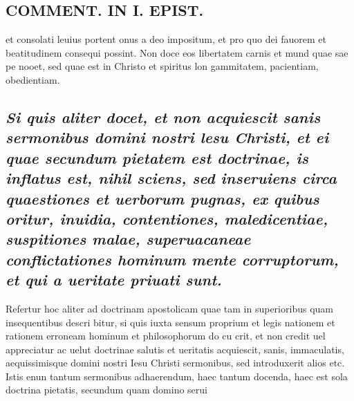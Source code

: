 \documentclass{article}
\begin{document}
\begin{pages}
\section*{COMMENT. IN I. EPIST. }
\marginpar{[ p.156 ]}\pstart et consolati leuius portent onus a deo impositum, et pro quo dei fauorem et beatitudinem consequi possint. Non doce eos libertatem carnis et mund quae sae pe nooet, sed quae est in Christo et spiritus lon gammitatem, pacientiam, obedientiam.  \pend
{}
{}
\subsection*{\textit{Si quis aliter docet, et non acquiescit sanis sermonibus domini nostri lesu Christi, et ei quae secundum pietatem est doctrinae, is inflatus est, nihil sciens, sed inseruiens circa quaestiones et uerborum pugnas, ex quibus oritur, inuidia, contentiones, maledicentiae, suspitiones malae, superuacaneae conflictationes hominum mente corruptorum, et qui a ueritate priuati sunt. }}\pstart Refertur hoc aliter ad doctrinam apostolicam quae tam in superioribus quam insequentibus descri bitur, si quis iuxta sensum proprium et legis nationem et rationem erroneam hominum et philosophorum do cu crit, et non credit uel appreciatur ac uelut doctrinae salutis et ueritatis acquiescit, sanis, immaculatis, aequissimisque domini nostri Iesu Christi sermonibus, sed introduxerit alios etc. Istis enun tantum sermonibus adhaerendum, haec tantum docenda, haec est sola doctrina pietatis, secundum quam domino serui\pend

\end{pages}
\end{document}
